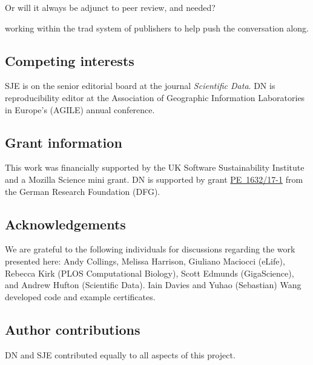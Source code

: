 \documentclass[12pt]{article}
\begin{document}
Or will it always be adjunct to peer review, and needed?

working within the trad system of publishers to help push the
conversation along.




\subsection*{Competing interests}

SJE is on the senior editorial board at the journal \emph{Scientific
Data}.
DN is reproducibility editor at the Association of Geographic Information 
Laboratories in Europe's (AGILE) annual conference.

\subsection*{Grant information}

This work was financially supported by the UK Software
Sustainability Institute and a Mozilla Science mini grant.
DN is supported by grant
\href{https://gepris.dfg.de/gepris/projekt/415851837}{PE~1632/17-1}
from the German Research Foundation (DFG).

\subsection*{Acknowledgements}\label{acknowledgements}

We are grateful to the following individuals for discussions regarding
the work presented here: Andy Collings, Melissa Harrison, Giuliano
Maciocci (eLife), Rebecca Kirk (PLOS Computational Biology), Scott
Edmunds (GigaScience), and Andrew Hufton (Scientific Data). Iain Davies and
Yuhao (Sebastian) Wang developed code and example certificates.

\subsection*{Author contributions}

DN and SJE contributed equally to all aspects of this project.

{\small
}

\end{document}
